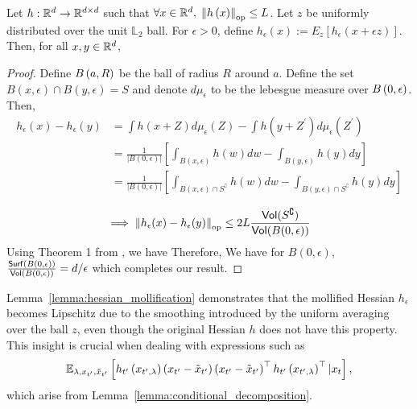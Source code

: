 \begin{lemma}\label{lemma:hessian_mollification}
    Let $h : \mathbb{R}^{d} \rightarrow \mathbb{R}^{d \times d}$ such that $\forall x \in \mathbb{R}^{d}, \; \left\lVert h\left(x\right)\right\rVert_{\textup{op}} \leq L$. Let $z$ be uniformly distributed over the unit $\mathbb{L}_{2}$ ball. For $\epsilon > 0$, define $h_{\epsilon}(x) := E_{z}[h_{\epsilon}(x + \epsilon z)]$. Then, for all $x, y \in \mathbb{R}^{d}$, 
\end{lemma}
\begin{proof}
Define $B\left(a, R\right)$ be the ball of radius $R$ around $a$. Define the set $B(x,\epsilon)\cap B(y,\epsilon) = S$ and denote $d\mu_{\epsilon}$ to be the lebesgue measure over $B\left(0,\epsilon\right)$. Then,
\begin{align}
    h_{\epsilon}(x) - h_{\epsilon}(y) &= \int h(x+Z)d\mu_{\epsilon}(Z) - \int h(y+Z^{\prime})d\mu_{\epsilon}(Z^\prime) \nonumber \\
    &= \frac{1}{|B(0,\epsilon)|}\left[\int_{B(x,\epsilon)} h(w)dw -\int_{B(y,\epsilon)} h(y)dy \right] \nonumber \\
    &= \frac{1}{|B(0,\epsilon)|}\left[\int_{B(x,\epsilon)\cap S^{\complement}} h(w)dw -\int_{B(y,\epsilon)\cap S^{\complement}} h(y)dy \right] \nonumber \\
\end{align}
$$ \implies \left\lVert h_{\epsilon}(x) - h_{\epsilon}(y)\right\rVert_{\textup{op}} \leq 2L \frac{\mathsf{Vol}(S^{\complement})}{\mathsf{Vol}(B(0,\epsilon))}$$
Using Theorem 1 from \cite{schymura2014upper}, we have
Therefore, 
We have for $B(0,\epsilon)$,  $\frac{\mathsf{Surf}\left(B(0,\epsilon)\right)}{\mathsf{Vol}(B(0,\epsilon))} = d/\epsilon$ which completes our result.
\end{proof}

Lemma~\ref{lemma:hessian_mollification} demonstrates that the mollified Hessian \(h_{\epsilon}\) becomes Lipschitz due to the smoothing introduced by the uniform averaging over the ball \(z\), even though the original Hessian \(h\) does not have this property. This insight is crucial when dealing with expressions such as 
\[
\mathbb{E}_{\lambda, x_{t'}, \tilde{x}_{t'}}\left[h_{t'}\left(x_{t',\lambda}\right)\left(x_{t'}-\tilde{x}_{t'}\right)\left(x_{t'}-\tilde{x}_{t'}\right)^{\top}h_{t'}\left(x_{t',\lambda}\right)^{\top}|x_{t}\right],
\]
which arise from Lemma~\ref{lemma:conditional_decomposition}.

